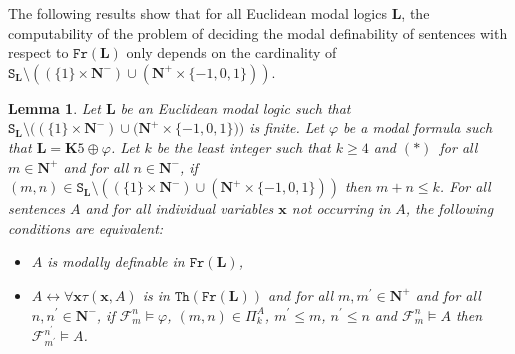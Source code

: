 \documentclass[draft]{article}
\newtheorem{lemma}{Lemma}
\def\Th{\mathtt{Th}}
\def\Fr{\mathtt{Fr}}
\def\L{\mathbf{L}}
\def\K{\mathbf{K}}
\begin{document}
The following results show that for all Euclidean modal logics $\L$, the computability of the problem of deciding the modal definability of sentences with respect to $\Fr(\L)$ only depends on the cardinality of $\mathtt{S}_{\L}{\setminus}((\{1\}{\times}\mathbf{N}^{-}){\cup}(\mathbf{N}^{+}{\times}\{{-}1,0,1\}))$.
%
%
\begin{lemma}\label{proposition:gamma:gamma:L:finite:sl:setminus:ensemble:TFCAE:sentence:A}
%
%
Let $\L$ be an Euclidean modal logic such that $\mathtt{S}_{\L}{\setminus}((\{1\}{\times}\mathbf{N}^{-}){\cup}(\mathbf{N}^{+}{\times}
%
%
%
%
%
%
%
%
%
%
%
%
$\linebreak$
%
%
%
%
%
%
%
%
%
%
%
%
\{{-}1,0,1\}))$ is finite.
Let $\varphi$ be a modal formula such that $\L{=}\K5{\oplus}\varphi$.
Let $k$ be the least integer such that $k{\geq}4$ and $(\ast)$~for all $m{\in}\mathbf{N}^{+}$ and for all $n{\in}\mathbf{N}^{-}$, if $(m,n){\in}\mathtt{S}_{\L}{\setminus}((\{1\}{\times}\mathbf{N}^{-}){\cup}(\mathbf{N}^{+}{\times}\{{-}1,0,1\}))$ then $m{+}n{\leq}k$.
For all sentences $A$ and for all individual variables $\mathbf{x}$ not occurring in $A$, the following conditions are equivalent:
%
%
\begin{itemize}
%
%
\item $A$ is modally definable in $\Fr(\L)$,
%
%
\item $A{\leftrightarrow}\forall\mathbf{x}\tau(\mathbf{x},A)$ is in $\Th(\Fr(\L))$ and for all $m,m^{\prime}{\in}\mathbf{N}^{+}$ and for all $n,n^{\prime}{\in}\mathbf{N}^{-}$, if ${\mathcal F}_{m}^{n}{\models}\varphi$, $(m,n){\in}\Pi_{k}^{A}$, $m^{\prime}{\leq}m$, $n^{\prime}{\leq}n$ and ${\mathcal F}_{m}^{n}{\models}A$ then ${\mathcal F}_{m^{\prime}}^{n^{\prime}}{\models}A$.
%
%
\end{itemize}
%
%
\end{lemma}
%
%
\end{document}
